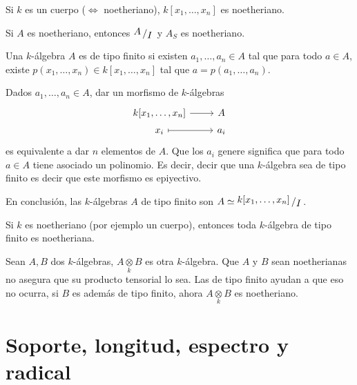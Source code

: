 \begin{cor}
    Si $k$ es un cuerpo ($\iff$ noetheriano), $k[x_1,\ldots,x_n]$ es noetheriano.

    Si $A$ es noetheriano, entonces $\modulo{A}{I}$ y $A_S$ es noetheriano.
\end{cor}
\begin{defi}
    Una $k$-\'algebra $A$ es de tipo finito si existen $a_1, \ldots, a_n \in A$ tal que para todo $a\in A$, existe $p(x_1, \ldots, x_n) \in k[x_1, \ldots, x_n]$ tal que $a=p(a_1, \ldots, a_n)$. 
    
    Dados $a_1, \ldots, a_n\in A$, dar un morfismo de $k$-\'algebras 
    $$\bt k[x_1, \ldots, x_n] \rar & A \\[-5mm] x_i \rarmaps & a_i \et$$
    es equivalente a dar $n$ elementos de $A$. Que los $a_i$ genere significa que para todo $a\in A$ tiene asociado un polinomio. Es decir, decir que una $k$-\'algebra sea de tipo finito es decir que este morfismo es epiyectivo.

    En conclusi\'on, las $k$-\'algebras $A$ de tipo finito son $A \simeq \modulo{k[x_1, \ldots, x_n]}{I}$.
\end{defi}
\begin{cor}
    Si $k$ es noetheriano (por ejemplo un cuerpo), entonces toda $k$-\'algebra de tipo finito es noetheriana. 
\end{cor}
\begin{obs}
     Sean $A,B$ dos $k$-\'algebras, $A \underset{k}{\otimes} B$ es otra $k$-\'algebra. Que $A$ y $B$ sean noetherianas no asegura que su producto tensorial lo sea. Las de tipo finito ayudan a que eso no ocurra, si $B$ es adem\'as de tipo finito, ahora $A \underset{k}{\otimes} B$ es noetheriano. 
\end{obs}



\section{Soporte, longitud, espectro y radical}

